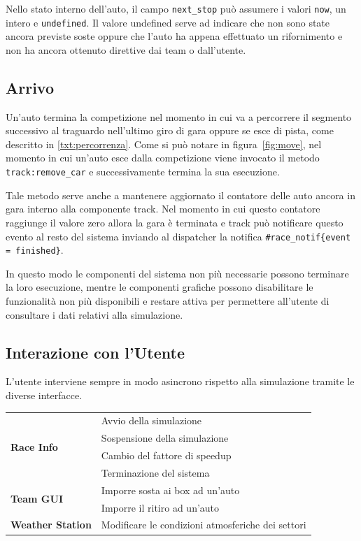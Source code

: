 \documentclass[11pt,a4paper]{report}
\newcommand{\fun}[1]{\texttt{#1}}
\begin{document}
Nello stato interno dell'auto, il campo \fun{next\_stop} può assumere i valori \fun{now}, un intero e \fun{undefined}. Il valore undefined serve ad indicare che non sono state ancora previste soste oppure che l'auto ha appena effettuato un rifornimento e non ha ancora ottenuto direttive dai team o dall'utente.

\subsection{Arrivo}
Un'auto termina la competizione nel momento in cui va a percorrere il segmento successivo al traguardo nell'ultimo giro di gara oppure se esce di pista, come descritto in \ref{txt:percorrenza}. Come si può notare in figura~\ref{fig:move}, nel momento in cui un'auto esce dalla competizione viene invocato il metodo \fun{track:remove\_car} e successivamente termina la sua esecuzione.

Tale metodo serve anche a mantenere aggiornato il contatore delle auto ancora in gara interno alla componente track. Nel momento in cui questo contatore raggiunge il valore zero allora la gara è terminata e track può notificare questo evento al resto del sistema inviando al dispatcher la notifica \fun{\#race\_notif\{event = finished\}}.

In questo modo le componenti del sistema non più necessarie possono terminare la loro esecuzione, mentre le componenti grafiche possono disabilitare le funzionalità non più disponibili e restare attiva per permettere all'utente di consultare i dati relativi alla simulazione.
\subsection{Interazione con l'Utente}
L'utente interviene sempre in modo asincrono rispetto alla simulazione tramite le diverse interfacce.
\begin{center}
\begin{tabular}{|l|l|}
\hline
\multirow{4}{*}{\textbf{Race Info}} & Avvio della simulazione\\
& Sospensione della simulazione\\
& Cambio del fattore di speedup\\
& Terminazione del sistema\\
\hline
\multirow{2}{*}{\textbf{Team GUI}} & Imporre sosta ai box ad un'auto\\
& Imporre il ritiro ad un'auto\\
\hline
\textbf{Weather Station} & Modificare le condizioni atmosferiche dei settori\\
\hline
\end{tabular}
\end{center}
\end{document}
